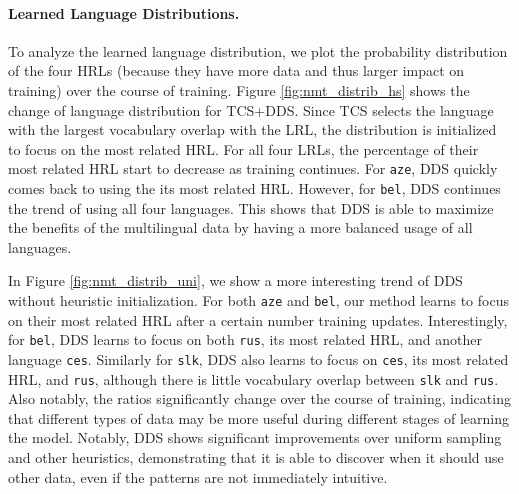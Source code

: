 \paragraph{Learned Language Distributions.}
To analyze the learned language distribution, we plot the probability distribution of the four HRLs (because they have more data and thus larger impact on training) over the course of training.  Figure \ref{fig:nmt_distrib_hs} shows the change of language distribution for TCS+DDS. Since TCS selects the language with the largest vocabulary overlap with the LRL, the distribution is initialized to focus on the most related HRL. For all four LRLs, the percentage of their most related HRL start to decrease as training continues. For \texttt{aze}, DDS quickly comes back to using the its most related HRL. However, for \texttt{bel}, DDS continues the trend of using all four languages. This shows that DDS is able to maximize the benefits of the multilingual data by having a more balanced usage of all languages. 

In Figure \ref{fig:nmt_distrib_uni}, we show a more interesting trend of DDS without heuristic initialization.
For both \texttt{aze} and \texttt{bel}, our method learns to focus on their most related HRL after a certain number training updates.
Interestingly, for \texttt{bel}, DDS learns to focus on both \texttt{rus}, its most related HRL, and another language \texttt{ces}. Similarly for \texttt{slk}, DDS also learns to focus on \texttt{ces}, its most related HRL, and \texttt{rus}, although there is little vocabulary overlap between \texttt{slk} and \texttt{rus}.
Also notably, the ratios significantly change over the course of training, indicating that different types of data may be more useful during different stages of learning the model.
Notably, DDS shows significant improvements over uniform sampling and other heuristics, demonstrating that it is able to discover when it should use other data, even if the patterns are not immediately intuitive.
